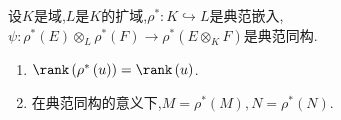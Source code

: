 \begin{corollary}{}{}
	设$K$是域,$L$是$K$的扩域,$\rho^{\ast}:K\hookrightarrow L$是典范嵌入,$\psi:\rho^{\ast}\left(E\right)\otimes_{L}\rho^{\ast}\left(F\right)\to\rho^{\ast}\left(E\otimes_{K}F\right)$是典范同构.
	\begin{enumerate}
		\item $\rank\left(\rho^{\ast}\left(u\right)\right)=\rank\left(u\right)$.
		\item 在典范同构的意义下,$M=\rho^{\ast}\left(M\right),N=\rho^{\ast}\left(N\right)$.
	\end{enumerate}
\end{corollary}




























